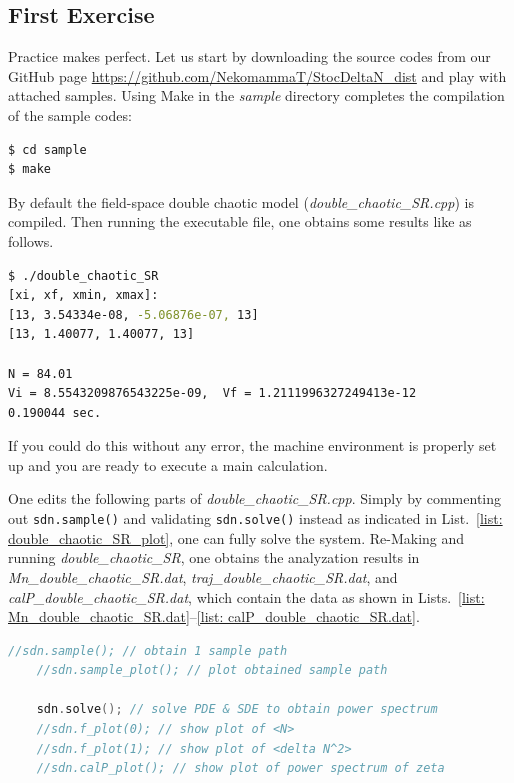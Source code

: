 \documentclass[aps, prd
, preprint
, nofootinbib 
, notitlepage
, superscriptaddress
, longbibliography
]{revtex4-1}
\begin{document}
\subsection{First Exercise}

Practice makes perfect. 
Let us start by downloading the source codes from our GitHub page \url{https://github.com/NekomammaT/StocDeltaN_dist} and play with attached samples.
Using Make in the \textit{sample} directory completes the compilation of the sample codes:
\begin{lstlisting}[language = bash, numbers = none]
$ cd sample
$ make
\end{lstlisting}
By default the field-space double chaotic model (\emph{double\_chaotic\_SR.cpp}) is compiled. Then running the executable file, one obtains some results like as follows.
\begin{lstlisting}[language = bash, numbers = none]
$ ./double_chaotic_SR
[xi, xf, xmin, xmax]:
[13, 3.54334e-08, -5.06876e-07, 13]
[13, 1.40077, 1.40077, 13]

N = 84.01
Vi = 8.5543209876543225e-09,  Vf = 1.2111996327249413e-12
0.190044 sec.
\end{lstlisting}
If you could do this without any error, the machine environment is properly set up and you are ready to execute a main calculation.

One edits the following parts of \textit{double\_chaotic\_SR.cpp}. Simply by commenting out \texttt{sdn.sample()} and validating \texttt{sdn.solve()} instead as 
indicated in List.~\ref{list: double_chaotic_SR_plot},
one can fully solve the system.
Re-Making and running \textit{double\_chaotic\_SR}, one obtains the analyzation results in 
\textit{Mn\_double\_chaotic\_SR.dat}, \textit{traj\_double\_chaotic\_SR.dat},
and \textit{calP\_double\_chaotic\_SR.dat}, which contain the data as shown in Lists.~\ref{list: Mn_double_chaotic_SR.dat}--\ref{list: calP_double_chaotic_SR.dat}.

\begin{lstlisting}[language = C++, caption=\textit{sample/double\_chaotic\_SR.cpp}, label = list: double_chaotic_SR_plot, firstnumber = 82]
	//sdn.sample(); // obtain 1 sample path
	//sdn.sample_plot(); // plot obtained sample path 
	
	sdn.solve(); // solve PDE & SDE to obtain power spectrum  
	//sdn.f_plot(0); // show plot of <N>
	//sdn.f_plot(1); // show plot of <delta N^2> 
	//sdn.calP_plot(); // show plot of power spectrum of zeta
\end{lstlisting}
\end{document}
